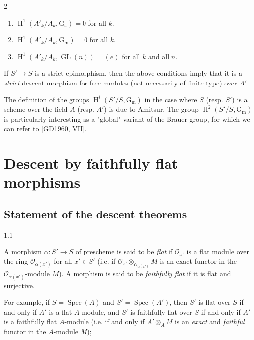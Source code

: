 \begin{example}{2}
    
 \begin{enumerate}
      
 \item[i.]
        \(\operatorname {H}^1(A'_k/A_k,\operatorname {G_a})=0\) for all \(k\).
      

      
 \item[ii.]
        \(\operatorname {H}^1(A'_k/A_k,\operatorname {G_m})=0\) for all \(k\).
      

      
 \item[iii.]
        \(\operatorname {H}^1(A'_k/A_k,\operatorname {GL}(n))=(e)\) for all \(k\) and all \(n\).
      

    \end{enumerate}


    If \(S'\to  S\) is a strict epimorphism, then the above conditions imply that it is a \emph{strict} descent morphism for free modules (not necessarily of finite type) over \(A'\).\end{example}\begin{remark}{}\label{fga3.i-a.4.e-remark}\skipsinglepar\par{}The definition of the groups \(\operatorname {H}^i(S'/S,\operatorname {G_m})\) in the case where \(S\) (resp. \(S'\)) is a scheme over the field \(A\) (resp. \(A'\)) is due to Amitsur.
    The group \(\operatorname {H}^2(S'/S,\operatorname {G_m})\) is particularly interesting as a "global" variant of the Brauer group, for which we can refer to [\hyperref[GD1960]{GD1960}, VII].\end{remark}\chapter{Descent by faithfully flat morphisms}\thispagestyle{fancy}\label{fga3.i-b}\section{Statement of the descent theorems}\label{fga3.i-b.1}\begin{definition}{1.1}\label{fga3.i-b.1-definition-1.1}\skipsinglepar\par{}A morphism \(\alpha \colon  S'\to  S\) of prescheme is said to be \emph{flat} if \(\mathscr {O}_{x'}\) is a flat module over the ring \(\mathscr {O}_{\alpha (x')}\) for all \(x'\in  S'\) (i.e. if \(\mathscr {O}_{x'}\otimes _{\mathscr {O}_{\alpha (x')}}M\) is an exact functor in the \(\mathscr {O}_{\alpha (x')}\)-module \(M\)).
    A morphism is said to be \emph{faithfully flat} if it is flat and surjective.\end{definition}\par{}For example, if \(S=\operatorname {Spec}(A)\) and \(S'=\operatorname {Spec}(A')\), then \(S'\) is flat over \(S\) if and only if \(A'\) is a flat \(A\)-module, and \(S'\) is faithfully flat over \(S\) if and only if \(A'\) is a faithfully flat \(A\)-module (i.e. if and only if \(A'\otimes _A M\) is an \emph{exact} and \emph{faithful} functor in the \(A\)-module \(M\));
